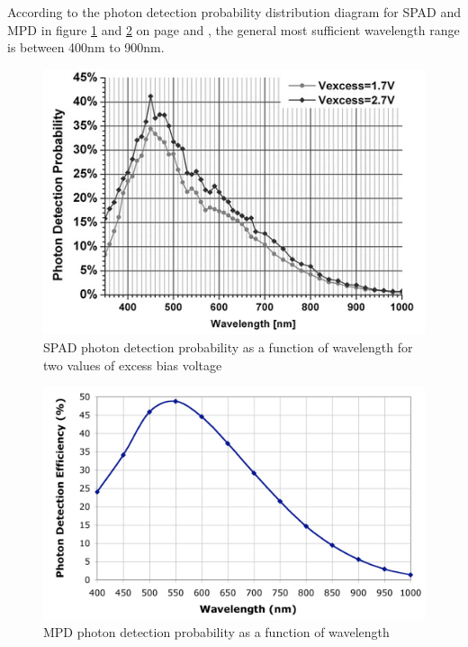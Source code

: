 According to the photon detection probability distribution diagram for \acs{SPAD} and \acs{MPD} in figure \ref{fig:SPAD_efficiency} and \ref{fig:MPD_efficiency} on page \pageref{fig:SPAD_efficiency} and \pageref{fig:MPD_efficiency}, the general most sufficient wavelength range is between 400nm to 900nm. 

\begin{figure}[ht!]
\centering
\includegraphics[scale=1]{chapters/img/SPAD_efficiency.png}
\caption{\acs{SPAD} photon detection probability as a function of wavelength for two values of excess bias voltage}
\label{fig:SPAD_efficiency}
\end{figure}

\begin{figure}[ht!]
\centering
\includegraphics[scale=1]{chapters/img/MPD_efficiency.png}
\caption{\acs{MPD} photon detection probability as a function of wavelength}
\label{fig:MPD_efficiency}
\end{figure}

